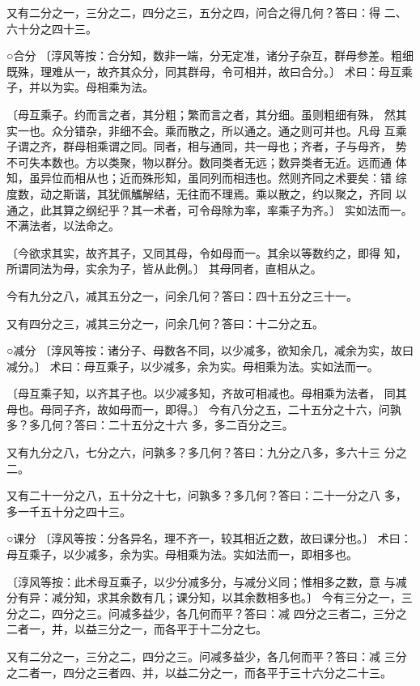 \documentclass[a4paper,12pt,UTF8,twoside]{ctexbook}
\begin{document}
又有二分之一，三分之二，四分之三，五分之四，问合之得几何？答曰：得 二、六十分之四十三。

○合分 〔淳风等按：合分知，数非一端，分无定准，诸分子杂互，群母参差。粗细 既殊，理难从一，故齐其众分，同其群母，令可相并，故曰合分。〕 术曰：母互乘子，并以为实。母相乘为法。

〔母互乘子。约而言之者，其分粗；繁而言之者，其分细。虽则粗细有殊， 然其实一也。众分错杂，非细不会。乘而散之，所以通之。通之则可并也。凡母 互乘子谓之齐，群母相乘谓之同。同者，相与通同，共一母也；齐者，子与母齐， 势不可失本数也。方以类聚，物以群分。数同类者无远；数异类者无近。远而通 体知，虽异位而相从也；近而殊形知，虽同列而相违也。然则齐同之术要矣：错 综度数，动之斯谐，其犹佩觿解结，无往而不理焉。乘以散之，约以聚之，齐同 以通之，此其算之纲纪乎？其一术者，可令母除为率，率乘子为齐。〕 实如法而一。不满法者，以法命之。

〔今欲求其实，故齐其子，又同其母，令如母而一。其余以等数约之，即得 知，所谓同法为母，实余为子，皆从此例。〕 其母同者，直相从之。

今有九分之八，减其五分之一，问余几何？答曰：四十五分之三十一。

又有四分之三，减其三分之一，问余几何？答曰：十二分之五。

○减分 〔淳风等按：诸分子、母数各不同，以少减多，欲知余几，减余为实，故曰 减分。〕 术曰：母互乘子，以少减多，余为实。母相乘为法。实如法而一。

〔母互乘子知，以齐其子也。以少减多知，齐故可相减也。母相乘为法者， 同其母也。母同子齐，故如母而一，即得。〕 今有八分之五，二十五分之十六，问孰多？多几何？答曰：二十五分之十六 多，多二百分之三。

又有九分之八，七分之六，问孰多？多几何？答曰：九分之八多，多六十三 分之二。

又有二十一分之八，五十分之十七，问孰多？多几何？答曰：二十一分之八 多，多一千五十分之四十三。

○课分 〔淳风等按：分各异名，理不齐一，较其相近之数，故曰课分也。〕 术曰：母互乘子，以少减多，余为实。母相乘为法。实如法而一，即相多也。

〔淳风等按：此术母互乘子，以少分减多分，与减分义同；惟相多之数，意 与减分有异：减分知，求其余数有几；课分知，以其余数相多也。〕 今有三分之一，三分之二，四分之三。问减多益少，各几何而平？答曰：减 四分之三者二，三分之二者一，并，以益三分之一，而各平于十二分之七。

又有二分之一，三分之二，四分之三。问减多益少，各几何而平？答曰：减 三分之二者一，四分之三者四、并，以益二分之一，而各平于三十六分之二十三。
\end{document}
